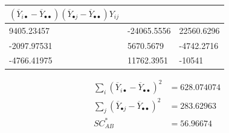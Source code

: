 \documentclass[]{book}
\theoremstyle{definition}
\theoremstyle{definition}
\theoremstyle{definition}
\theoremstyle{remark}
\begin{document}
\begin{longtable}[]{@{}lll@{}}
\toprule
\begin{minipage}[b]{0.82\columnwidth}\raggedright
\(\left( \overline{Y}_{i \bullet} - \overline{Y}_{\bullet \bullet} \right)\left( \overline{Y}_{\bullet j} - \overline{Y}_{\bullet \bullet} \right)Y_{ij}\)\strut
\end{minipage} & \begin{minipage}[b]{0.05\columnwidth}\raggedright
\strut
\end{minipage} & \begin{minipage}[b]{0.05\columnwidth}\raggedright
\strut
\end{minipage}\tabularnewline
\midrule
\endhead
\begin{minipage}[t]{0.82\columnwidth}\raggedright
9405.23457\strut
\end{minipage} & \begin{minipage}[t]{0.05\columnwidth}\raggedright
-24065.5556\strut
\end{minipage} & \begin{minipage}[t]{0.05\columnwidth}\raggedright
22560.6296\strut
\end{minipage}\tabularnewline
\begin{minipage}[t]{0.82\columnwidth}\raggedright
-2097.97531\strut
\end{minipage} & \begin{minipage}[t]{0.05\columnwidth}\raggedright
5670.5679\strut
\end{minipage} & \begin{minipage}[t]{0.05\columnwidth}\raggedright
-4742.2716\strut
\end{minipage}\tabularnewline
\begin{minipage}[t]{0.82\columnwidth}\raggedright
-4766.41975\strut
\end{minipage} & \begin{minipage}[t]{0.05\columnwidth}\raggedright
11762.3951\strut
\end{minipage} & \begin{minipage}[t]{0.05\columnwidth}\raggedright
-10541\strut
\end{minipage}\tabularnewline
\bottomrule
\end{longtable}

\[
\begin{aligned}
\sum_{i}^{}{\left( \overline{Y}_{i \bullet} - \overline{Y}_{\bullet \bullet} \right)^{2}} &= 628.074074\\
\sum_{j}^{}{\left( \overline{Y}_{\bullet j} - \overline{Y}_{\bullet \bullet} \right)^{2}} &=283.62963\\
SC_{AB}^{*}  &=  56.96674
\end{aligned}
\]
\end{document}
